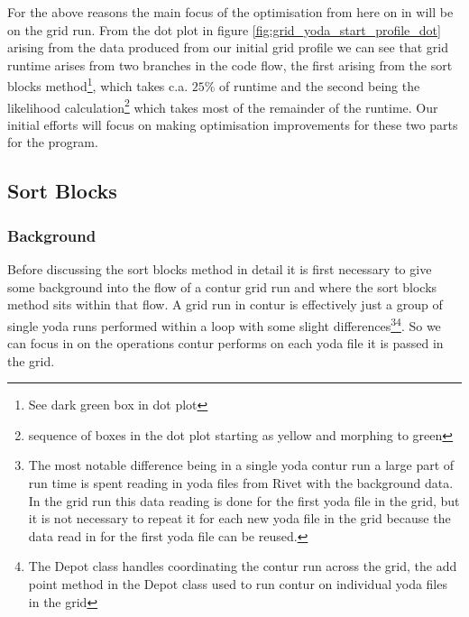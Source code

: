 For the above reasons the main focus of the optimisation from here on in will be on the grid run. From the dot plot in figure \ref{fig:grid_yoda_start_profile_dot} arising from the data produced from our initial grid profile we can see that grid runtime arises from two branches in the code flow, the first arising from the sort blocks method\footnote{See dark green box in dot plot}, which takes c.a. $25\%$ of runtime and the second being the likelihood calculation\footnote{sequence of boxes in the dot plot starting as yellow and morphing to green} which takes most of the remainder of the runtime. Our initial efforts will focus on making optimisation improvements for these two parts for the program.

\subsection{Sort Blocks}\label{sortBlocksSection}

\subsubsection{Background}
Before discussing the sort blocks method in detail it is first necessary to give some background into the flow of a contur grid run and where the sort blocks method sits within that flow. A grid run in contur is effectively just a group of single yoda runs performed within a loop with some slight differences\footnote{The most notable difference being in a single yoda contur run a large part of run time is spent reading in yoda files from Rivet with the background data. In the grid run this data reading is done for the first yoda file in the grid, but it is not necessary to repeat it for each new yoda file in the grid because the data read in for the first yoda file can be reused.}\footnote{The Depot class handles coordinating the contur run across the grid, the add point method in the Depot class used to run contur on individual yoda files in the grid}. So we can focus in on the operations contur performs on each yoda file it is passed in the grid. 

